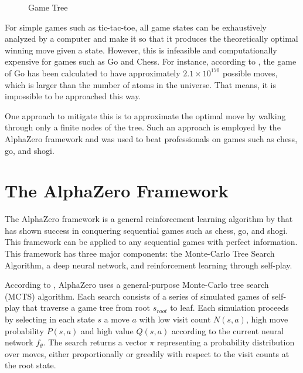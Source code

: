 \begin{figure}[htb]
    \centering
    \caption{Game Tree}
    \label{fig:game-tree}
\end{figure}

For simple games such as tic-tac-toe, all game states can be exhaustively analyzed by a computer and make it so that it produces the theoretically optimal winning move given a state. However, this is infeasible and computationally expensive for games such as Go and Chess. For instance, according to  \cite{jontromp}, the game of Go has been calculated to have approximately $2.1 \times 10^{170}$ possible moves, which is larger than the number of atoms in the universe. That means, it is  impossible to be approached this way. %

One approach to mitigate this is to approximate the optimal move by walking through only a finite nodes of the tree. Such an approach is employed by the AlphaZero framework and was used to beat professionals on games such as chess, go, and shogi.

\section{The AlphaZero Framework}

The AlphaZero framework is a general reinforcement learning algorithm by \cite{silver2017masteringchessshogiselfplay} that has shown success in conquering sequential games such as chess, go, and shogi. This framework can be applied to any sequential games with perfect information. This framework has three major components: the Monte-Carlo Tree Search Algorithm, a deep neural network, and reinforcement learning through self-play.

According to \cite{silver2017masteringchessshogiselfplay}, AlphaZero uses a general-purpose Monte-Carlo tree search (MCTS) algorithm. Each search consists of a series of simulated games of self-play that traverse a game tree from root $s_{root}$ to leaf. Each simulation proceeds by selecting in each state $s$ a move $a$ with low visit count $N(s, a)$, high move probability $P(s,a)$ and high value $Q(s, a)$ according to the current neural network $f_\theta$. The search returns a vector $\pi$ representing a probability distribution over moves, either proportionally or greedily with respect to the visit counts at the root state.


